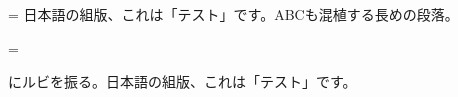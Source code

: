 \documentclass[paper=a5,fontsize=10pt]{jlreq}
\begin{document}
=\vbox{\zw \parindent=0pt
  日本語の組版、これは「テスト」です。ABCも混植する長めの段落。}

=\hbox{}

にルビを振る。日本語の組版、これは「テスト」です。
\end{document}
